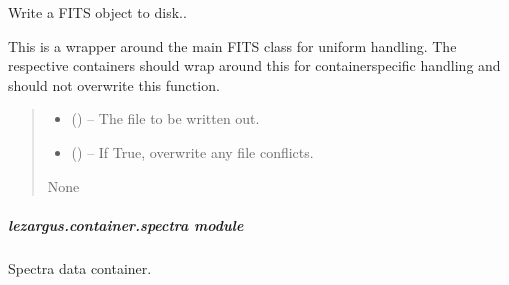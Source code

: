 \documentclass[letterpaper,11pt,english]{sphinxmanual}
\begin{document}
\begin{savenotes}
\begin{fulllineitems}
\begin{savenotes}\begin{fulllineitems}
\label{\detokenize{code/lezargus.container.parent:lezargus.container.parent.LezargusContainerArithmetic._write_fits_file}}
\pysigstartsignatures
{}
\pysigstopsignatures
\sphinxAtStartPar
Write a FITS object to disk..

\sphinxAtStartPar
This is a wrapper around the main FITS class for uniform handling.
The respective containers should wrap around this for
container\sphinxhyphen{}specific handling and should not overwrite this function.
\begin{quote}\begin{description}
\begin{itemize}
\item {} 
\sphinxAtStartPar
{} () – The file to be written out.

\item {} 
\sphinxAtStartPar
{} (\sphinxstyleliteralemphasis{\sphinxupquote{, }}) – If True, overwrite any file conflicts.

\end{itemize}

\sphinxAtStartPar
None

\end{description}\end{quote}

\end{fulllineitems}\end{savenotes}


\end{fulllineitems}\end{savenotes}


\sphinxstepscope


\subparagraph{lezargus.container.spectra module}
\label{\detokenize{code/lezargus.container.spectra:module-lezargus.container.spectra}}\label{\detokenize{code/lezargus.container.spectra:lezargus-container-spectra-module}}\label{\detokenize{code/lezargus.container.spectra::doc}}
\sphinxAtStartPar
Spectra data container.
\end{document}

